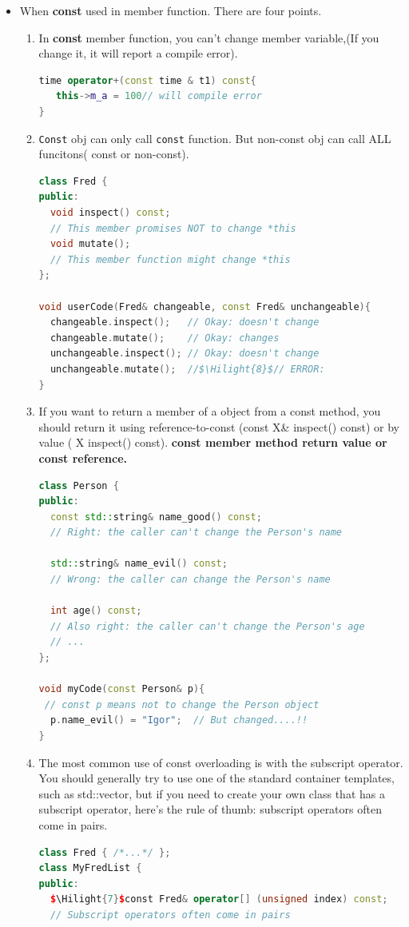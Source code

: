 \documentclass[a4paper,12pt,twoside]{book}
\newcommand{\Hilight}[1]{\makebox[0pt][l]{\color{yellow}\rule[-3pt]{#1em}{11pt}}}
\begin{document}
\begin{itemize}
\item When \textbf{const} used in member function. There are four points.
\begin{enumerate}
\item In \textbf{const} member function, you can't change member variable,(If you change it, it will report a compile error).
\begin{lstlisting}[frame=single, language=c++]
time operator+(const time & t1) const{
   this->m_a = 100// will compile error
}
\end{lstlisting}

\item \texttt{Const} obj can only call \texttt{const} function. But non-const obj can call ALL funcitons( const or non-const).
\begin{lstlisting}[frame=single, language=c++, mathescape=true]
class Fred {
public:
  void inspect() const;
  // This member promises NOT to change *this
  void mutate();
  // This member function might change *this
};

void userCode(Fred& changeable, const Fred& unchangeable){
  changeable.inspect();   // Okay: doesn't change
  changeable.mutate();    // Okay: changes
  unchangeable.inspect(); // Okay: doesn't change
  unchangeable.mutate();  //$\Hilight{8}$// ERROR:
}
\end{lstlisting}

\item If you want to return a member of a object from a const method, you should return it using reference-to-const (const X\& inspect() const) or by value ( X inspect() const). \textbf{const member method return value or const reference.}
\begin{lstlisting}[frame=single, language=c++]
class Person {
public:
  const std::string& name_good() const;
  // Right: the caller can't change the Person's name

  std::string& name_evil() const;
  // Wrong: the caller can change the Person's name

  int age() const;
  // Also right: the caller can't change the Person's age
  // ...
};

void myCode(const Person& p){
 // const p means not to change the Person object
  p.name_evil() = "Igor";  // But changed....!!
}
\end{lstlisting}

\item The most common use of const overloading is with the subscript operator. You should generally try to use one of the standard container templates, such as std::vector, but if you need to create your own class that has a subscript operator, here's the rule of thumb: subscript operators often come in pairs.
\begin{lstlisting}[frame=single, language=c++, mathescape=true]
class Fred { /*...*/ };
class MyFredList {
public:
  $\Hilight{7}$const Fred& operator[] (unsigned index) const;
  // Subscript operators often come in pairs


\end{lstlisting}
\end{enumerate}
\end{itemize}
\end{document}
